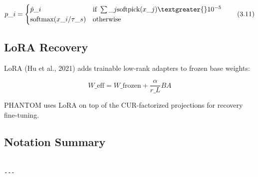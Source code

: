 \[
p\_i = \begin{cases} \hat{p}\_i & \text{if } \sum\_j \text{softpick}(x\_j) \textgreater{} 10^{-5} \\ \text{softmax}(x\_i / \tau\_s) & \text{otherwise} \end{cases}
\tag{3.11}
\]

\subsection{LoRA Recovery}

LoRA (Hu et al., 2021) adds trainable low-rank adapters to frozen base weights:

\[
W\_\text{eff} = W\_\text{frozen} + \frac{\alpha}{r\_L} B A
\tag{3.12}
\]

PHANTOM uses LoRA on top of the CUR-factorized projections for recovery 
fine-tuning.

\subsection{Notation Summary}

\begin{lstlisting}

---
\end{lstlisting}